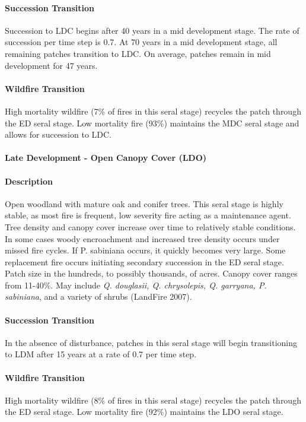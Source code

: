 \paragraph*{Succession Transition} Succession to LDC begins after 40 years in a mid development stage. The rate of succession per time step is 0.7. At 70 years in a mid development stage, all remaining patches transition to LDC. On average, patches remain in mid development for 47 years.

\paragraph*{Wildfire Transition} High mortality wildfire (7\% of fires in this seral stage) recycles the patch through the ED seral stage. Low mortality fire (93\%) maintains the MDC seral stage and allows for succession to LDC.

\noindent\hrulefill


\paragraph*{Late Development - Open Canopy Cover (LDO)}

\paragraph*{Description} Open woodland with mature oak and conifer trees. This seral stage is highly stable, as most fire is frequent, low severity fire acting as a maintenance agent. Tree density and canopy cover increase over time to relatively stable conditions. In some cases woody encroachment and increased tree density occurs under missed fire cycles. If P. sabiniana occurs, it quickly becomes very large. Some replacement fire occurs initiating secondary succession in the ED seral stage. Patch size in the hundreds, to possibly thousands, of acres. Canopy cover ranges from 11-40\%. May include \emph{Q. douglasii, Q. chrysolepis, Q. garryana, P. sabiniana}, and a variety of shrubs (LandFire 2007).

\paragraph*{Succession Transition} In the absence of disturbance, patches in this seral stage will begin transitioning to LDM after 15 years at a rate of 0.7 per time step. 

\paragraph*{Wildfire Transition} High mortality wildfire (8\% of fires in this seral stage) recycles the patch through the ED seral stage. Low mortality fire (92\%) maintains the LDO seral stage.

